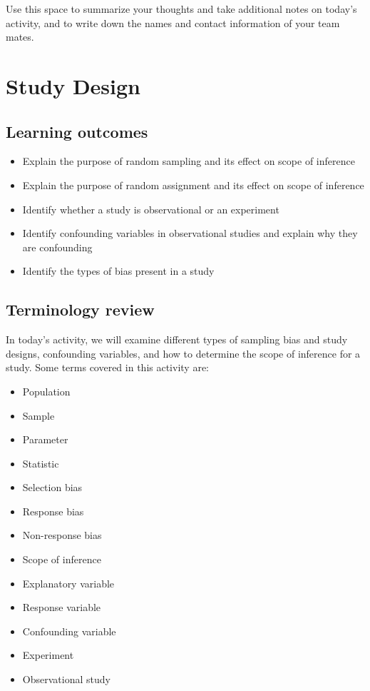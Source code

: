 \documentclass[
]{report}
\begin{document}
Use this space to summarize your thoughts and take additional notes on today's activity, and to write down the names and contact information of your team mates.

\hypertarget{study-design}{%
\chapter{Study Design}\label{study-design}}

\hypertarget{learning-outcomes}{%
\section{Learning outcomes}\label{learning-outcomes}}

\begin{itemize}
\item
  Explain the purpose of random sampling and its effect on scope of inference
\item
  Explain the purpose of random assignment and its effect on scope of inference
\item
  Identify whether a study is observational or an experiment
\item
  Identify confounding variables in observational studies and explain why they are confounding
\item
  Identify the types of bias present in a study
\end{itemize}

\hypertarget{terminology-review}{%
\section{Terminology review}\label{terminology-review}}

In today's activity, we will examine different types of sampling bias and study designs, confounding variables, and how to determine the scope of inference for a study. Some terms covered in this activity are:

\begin{itemize}
\item
  Population
\item
  Sample
\item
  Parameter
\item
  Statistic
\item
  Selection bias
\item
  Response bias
\item
  Non-response bias
\item
  Scope of inference
\item
  Explanatory variable
\item
  Response variable
\item
  Confounding variable
\item
  Experiment
\item
  Observational study
\end{itemize}
\end{document}
